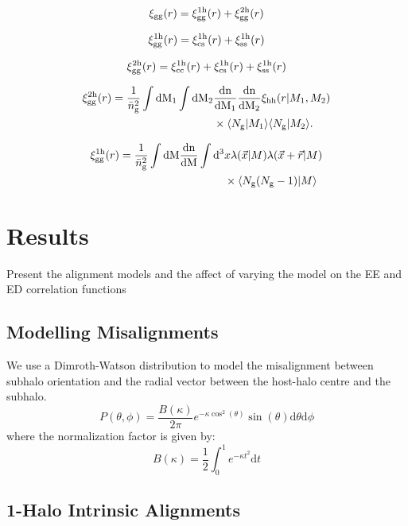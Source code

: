 \documentclass[fleqn,usenatbib]{mnras}
\newcommand{\beq}{\begin{eqnarray}}
\newcommand{\eeq}{\end{eqnarray}}
\newcommand{\tpcf}[1]{\xi_{\rm #1}}
\newcommand{\tpcftwo}[2]{\xi_{\rm #1}^{\rm #2}}
\newcommand{\dd}{\rm d}
\newcommand{\mean}[1]{\langle #1 \rangle}
\newcommand{\meantwo}[2]{\langle #1 \vert #2 \rangle}
\begin{document}
\beq
\tpcf{gg}(r) = \tpcftwo{gg}{1h}(r) + \tpcftwo{gg}{2h}(r)
\eeq

\beq
\tpcftwo{gg}{1h}(r) = \tpcftwo{cs}{1h}(r) + \tpcftwo{ss}{1h}(r) 
\eeq

\beq
\tpcftwo{gg}{2h}(r) =  \tpcftwo{cc}{1h}(r) + \tpcftwo{cs}{1h}(r) + \tpcftwo{ss}{1h}(r) 
\eeq

\begin{align}
\tpcftwo{gg}{2h}(r) =   \frac{1}{\bar{n}_{\rm g}^{2}}\int\dd M_1 \int\dd M_2 & \frac{\rm dn}{\dd M_1}\frac{\rm dn}{\dd M_2} \tpcf{hh}(r\vert M_1, M_2) \\& \times  \meantwo{N_{\rm g}}{M_1} \meantwo{N_{\rm g}}{M_2}. 
\end{align}

\begin{align}
\tpcftwo{gg}{1h}(r) =  \frac{1}{\bar{n}_{\rm g}^{2}} \int\dd M \frac{\rm dn}{\dd M} \int\dd^{3}& x\lambda(\vec{x}\vert M)\lambda(\vec{x}+\vec{r}\vert M)\\ & \times  \meantwo{N_{\rm g}(N_{\rm g}-1)}{M}
\end{align}


\section{Results}
Present the alignment models and the affect of varying the model on the EE and ED correlation functions

\subsection{Modelling Misalignments}
We use a Dimroth-Watson distribution to model the misalignment between subhalo orientation and the radial vector between the host-halo centre and the subhalo.   
%
\begin{equation}
P(\theta,\phi) = \frac{B(\kappa)}{2\pi}e^{-\kappa\cos^2(\theta)}\sin(\theta)\mathrm{d}\theta\mathrm{d}\phi
\label{eq:watson}
\end{equation}
%
where the normalization factor is given by:
%
\begin{equation}
B(\kappa) = \frac{1}{2}\int_0^1 e^{-\kappa t^2}\mathrm{d}t
\end{equation}
%

\subsection{1-Halo Intrinsic Alignments}
\end{document}
